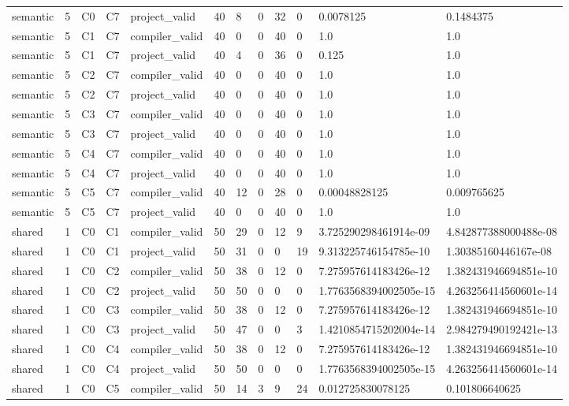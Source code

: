 \begin{tabular}{llllllllllll}
semantic & 5 & C0 & C7 & project\_valid & 40 & 8 & 0 & 32 & 0 & 0.0078125 & 0.1484375 \\
semantic & 5 & C1 & C7 & compiler\_valid & 40 & 0 & 0 & 40 & 0 & 1.0 & 1.0 \\
semantic & 5 & C1 & C7 & project\_valid & 40 & 4 & 0 & 36 & 0 & 0.125 & 1.0 \\
semantic & 5 & C2 & C7 & compiler\_valid & 40 & 0 & 0 & 40 & 0 & 1.0 & 1.0 \\
semantic & 5 & C2 & C7 & project\_valid & 40 & 0 & 0 & 40 & 0 & 1.0 & 1.0 \\
semantic & 5 & C3 & C7 & compiler\_valid & 40 & 0 & 0 & 40 & 0 & 1.0 & 1.0 \\
semantic & 5 & C3 & C7 & project\_valid & 40 & 0 & 0 & 40 & 0 & 1.0 & 1.0 \\
semantic & 5 & C4 & C7 & compiler\_valid & 40 & 0 & 0 & 40 & 0 & 1.0 & 1.0 \\
semantic & 5 & C4 & C7 & project\_valid & 40 & 0 & 0 & 40 & 0 & 1.0 & 1.0 \\
semantic & 5 & C5 & C7 & compiler\_valid & 40 & 12 & 0 & 28 & 0 & 0.00048828125 & 0.009765625 \\
semantic & 5 & C5 & C7 & project\_valid & 40 & 0 & 0 & 40 & 0 & 1.0 & 1.0 \\
shared & 1 & C0 & C1 & compiler\_valid & 50 & 29 & 0 & 12 & 9 & 3.725290298461914e-09 & 4.842877388000488e-08 \\
shared & 1 & C0 & C1 & project\_valid & 50 & 31 & 0 & 0 & 19 & 9.313225746154785e-10 & 1.30385160446167e-08 \\
shared & 1 & C0 & C2 & compiler\_valid & 50 & 38 & 0 & 12 & 0 & 7.275957614183426e-12 & 1.382431946694851e-10 \\
shared & 1 & C0 & C2 & project\_valid & 50 & 50 & 0 & 0 & 0 & 1.7763568394002505e-15 & 4.263256414560601e-14 \\
shared & 1 & C0 & C3 & compiler\_valid & 50 & 38 & 0 & 12 & 0 & 7.275957614183426e-12 & 1.382431946694851e-10 \\
shared & 1 & C0 & C3 & project\_valid & 50 & 47 & 0 & 0 & 3 & 1.4210854715202004e-14 & 2.984279490192421e-13 \\
shared & 1 & C0 & C4 & compiler\_valid & 50 & 38 & 0 & 12 & 0 & 7.275957614183426e-12 & 1.382431946694851e-10 \\
shared & 1 & C0 & C4 & project\_valid & 50 & 50 & 0 & 0 & 0 & 1.7763568394002505e-15 & 4.263256414560601e-14 \\
shared & 1 & C0 & C5 & compiler\_valid & 50 & 14 & 3 & 9 & 24 & 0.012725830078125 & 0.101806640625 \\

\end{tabular}
